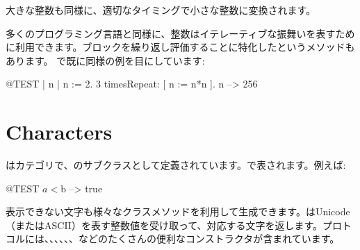 \documentclass[a4paper,10pt,twoside]{book}
\begin{document}
大きな整数も同様に、適切なタイミングで小さな整数に変換されます。

多くのプログラミング言語と同様に、整数はイテレーティブな振舞いを表すために利用できます。ブロックを繰り返し評価することに特化したというメソッドもあります。
で既に同様の例を目にしています:
\begin{code}{@TEST | n |}
n := 2.
3 timesRepeat: [ n := n*n ].
n --> 256
\end{code}

\section{Characters}

はカテゴリで、のサブクラスとして定義されています。で表されます。例えば:

\begin{code}{@TEST}
$a < $b --> true
\end{code}

表示できない文字も様々なクラスメソッドを利用して生成できます。\mbox{}はUnicode（またはASCII）を表す整数値を受け取って、対応する文字を返します。プロトコルには、、、、、、などのたくさんの便利なコンストラクタが含まれています。
\end{document}
